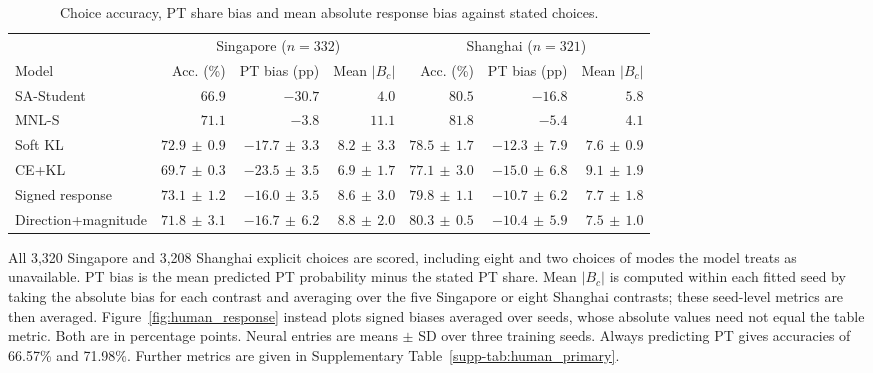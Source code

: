 \begin{table}[pos=htbp]\centering\small
\caption{Choice accuracy, PT share bias and mean absolute response bias against stated choices.}
\label{tab:human_main}
\setlength{\tabcolsep}{3pt}
\renewcommand{\arraystretch}{1.12}
\begin{tabular*}{\linewidth}{@{\extracolsep{\fill}}lrrrrrr@{}}
\toprule
& \multicolumn{3}{c}{Singapore ($n=332$)} & \multicolumn{3}{c}{Shanghai ($n=321$)} \\
\cmidrule(lr){2-4}\cmidrule(l){5-7}
Model & Acc. (\%) & PT bias (pp) & Mean $|B_c|$ & Acc. (\%) & PT bias (pp) & Mean $|B_c|$ \\
\midrule
SA-Student & $66.9$ & $-30.7$ & $4.0$ & $80.5$ & $-16.8$ & $5.8$ \\
MNL-S & $71.1$ & $-3.8$ & $11.1$ & $81.8$ & $-5.4$ & $4.1$ \\
Soft KL & $72.9\,\pm\,0.9$ & $-17.7\,\pm\,3.3$ & $8.2\,\pm\,3.3$ & $78.5\,\pm\,1.7$ & $-12.3\,\pm\,7.9$ & $7.6\,\pm\,0.9$ \\
CE+KL & $69.7\,\pm\,0.3$ & $-23.5\,\pm\,3.5$ & $6.9\,\pm\,1.7$ & $77.1\,\pm\,3.0$ & $-15.0\,\pm\,6.8$ & $9.1\,\pm\,1.9$ \\
Signed response & $73.1\,\pm\,1.2$ & $-16.0\,\pm\,3.5$ & $8.6\,\pm\,3.0$ & $79.8\,\pm\,1.1$ & $-10.7\,\pm\,6.2$ & $7.7\,\pm\,1.8$ \\
Direction+magnitude & $71.8\,\pm\,3.1$ & $-16.7\,\pm\,6.2$ & $8.8\,\pm\,2.0$ & $80.3\,\pm\,0.5$ & $-10.4\,\pm\,5.9$ & $7.5\,\pm\,1.0$ \\
\bottomrule
\end{tabular*}
\par\smallskip\begin{minipage}{\linewidth}\footnotesize
All 3,320 Singapore and 3,208 Shanghai explicit choices are scored, including eight and two choices of modes the model treats as unavailable. PT bias is the mean predicted PT probability minus the stated PT share. Mean $|B_c|$ is computed within each fitted seed by taking the absolute bias for each contrast and averaging over the five Singapore or eight Shanghai contrasts; these seed-level metrics are then averaged. Figure~\ref{fig:human_response} instead plots signed biases averaged over seeds, whose absolute values need not equal the table metric. Both are in percentage points. Neural entries are means $\pm$ SD over three training seeds. Always predicting PT gives accuracies of 66.57\% and 71.98\%. Further metrics are given in Supplementary Table~\ref{supp-tab:human_primary}.
\end{minipage}
\end{table}
